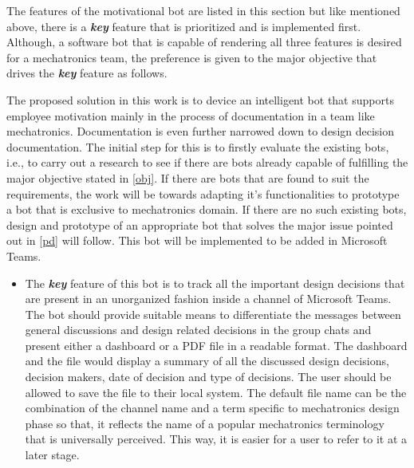 The features of the motivational bot are listed in this section but like mentioned above, there is a \textbf{\textit{key}} feature that is prioritized and is implemented first. Although, a software bot that is capable of rendering all three features is desired for a mechatronics team, the preference is given to the major objective that drives the \textit{\textbf{key}} feature as follows.

The proposed solution in this work is to device an intelligent bot that supports employee motivation mainly in the process of documentation in a team like mechatronics. Documentation is even further narrowed down to design decision documentation. The initial step for this is to firstly evaluate the existing bots, i.e., to carry out a research to see if there are bots already capable of fulfilling the major objective stated in \ref{obj}. If there are bots that are found to suit the requirements, the work will be towards adapting it’s functionalities to prototype a bot that is exclusive to mechatronics domain. If there are no such existing bots, design and prototype of an appropriate bot that solves the major issue pointed out in \ref{pd} will follow. This bot will be implemented to be added in Microsoft Teams.


\begin{itemize}
\item The \textbf{\textit{key}} feature of this bot is to track all the important design decisions that are present in an unorganized fashion inside a channel of Microsoft Teams. The bot should provide suitable means to differentiate the messages between general discussions and design related decisions in the group chats and present either a dashboard or a PDF file in a readable format. The dashboard and the file would display a summary of all the discussed design decisions, decision makers, date of decision and type of decisions. The user should be allowed to save the file to their local system. The default file name can be the combination of the channel name and a term specific to mechatronics design phase so that, it reflects the name of a popular mechatronics terminology that is universally perceived. This way, it is easier for a user to refer to it at a later stage.
\end{itemize}

